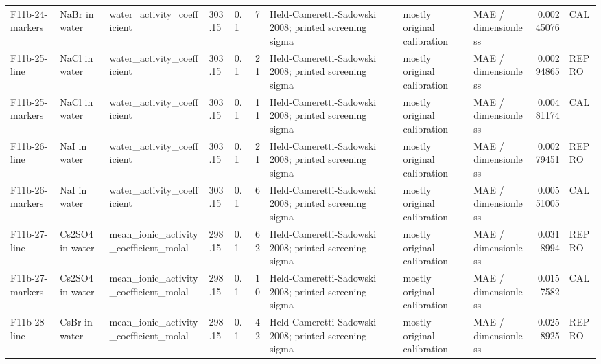\begin{landscape}
\begin{longtable}{L{1.9cm}L{2.5cm}L{2.1cm}L{1.6cm}L{1.6cm}rL{2.4cm}L{1.9cm}L{2.2cm}rL{1cm}}
F11b-\allowbreak{}24-\allowbreak{}markers & NaBr in water & water\_\allowbreak{}activity\_\allowbreak{}coefficient & 303.15 & 0.1 & 7 & Held-\allowbreak{}Cameretti-\allowbreak{}Sadowski 2008; printed screening sigma & mostly original calibration & MAE /\allowbreak{} dimensionless & 0.00245076 & CAL \\
F11b-\allowbreak{}25-\allowbreak{}line & NaCl in water & water\_\allowbreak{}activity\_\allowbreak{}coefficient & 303.15 & 0.1 & 21 & Held-\allowbreak{}Cameretti-\allowbreak{}Sadowski 2008; printed screening sigma & mostly original calibration & MAE /\allowbreak{} dimensionless & 0.00294865 & REPRO \\
F11b-\allowbreak{}25-\allowbreak{}markers & NaCl in water & water\_\allowbreak{}activity\_\allowbreak{}coefficient & 303.15 & 0.1 & 11 & Held-\allowbreak{}Cameretti-\allowbreak{}Sadowski 2008; printed screening sigma & mostly original calibration & MAE /\allowbreak{} dimensionless & 0.00481174 & CAL \\
F11b-\allowbreak{}26-\allowbreak{}line & NaI in water & water\_\allowbreak{}activity\_\allowbreak{}coefficient & 303.15 & 0.1 & 21 & Held-\allowbreak{}Cameretti-\allowbreak{}Sadowski 2008; printed screening sigma & mostly original calibration & MAE /\allowbreak{} dimensionless & 0.00279451 & REPRO \\
F11b-\allowbreak{}26-\allowbreak{}markers & NaI in water & water\_\allowbreak{}activity\_\allowbreak{}coefficient & 303.15 & 0.1 & 6 & Held-\allowbreak{}Cameretti-\allowbreak{}Sadowski 2008; printed screening sigma & mostly original calibration & MAE /\allowbreak{} dimensionless & 0.00551005 & CAL \\
F11b-\allowbreak{}27-\allowbreak{}line & Cs2SO4 in water & mean\_\allowbreak{}ionic\_\allowbreak{}activity\_\allowbreak{}coefficient\_\allowbreak{}molal & 298.15 & 0.1 & 62 & Held-\allowbreak{}Cameretti-\allowbreak{}Sadowski 2008; printed screening sigma & mostly original calibration & MAE /\allowbreak{} dimensionless & 0.0318994 & REPRO \\
F11b-\allowbreak{}27-\allowbreak{}markers & Cs2SO4 in water & mean\_\allowbreak{}ionic\_\allowbreak{}activity\_\allowbreak{}coefficient\_\allowbreak{}molal & 298.15 & 0.1 & 10 & Held-\allowbreak{}Cameretti-\allowbreak{}Sadowski 2008; printed screening sigma & mostly original calibration & MAE /\allowbreak{} dimensionless & 0.0157582 & CAL \\
F11b-\allowbreak{}28-\allowbreak{}line & CsBr in water & mean\_\allowbreak{}ionic\_\allowbreak{}activity\_\allowbreak{}coefficient\_\allowbreak{}molal & 298.15 & 0.1 & 42 & Held-\allowbreak{}Cameretti-\allowbreak{}Sadowski 2008; printed screening sigma & mostly original calibration & MAE /\allowbreak{} dimensionless & 0.0258925 & REPRO \\

\end{longtable}
\end{landscape}

